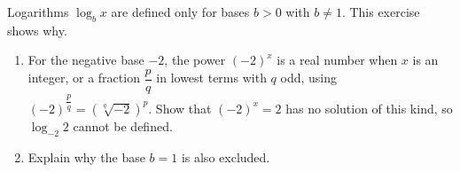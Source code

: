 Logarithms $\log_bx$ are defined only for bases $b>0$ with $b\ne1$. This exercise shows why.
\begin{enumerate}
\item[(a)] For the negative base $-2$, the power $(-2)^x$ is a real number when $x$ is an integer, or a fraction $\dfrac pq$ in lowest terms with $q$ odd, using $(-2)^{\dfrac pq}=\left(\sqrt[q]{-2}\right)^p$. Show that $(-2)^x=2$ has no solution of this kind, so $\log_{-2}2$ cannot be defined.
\item[(b)] Explain why the base $b=1$ is also excluded.
\end{enumerate}
